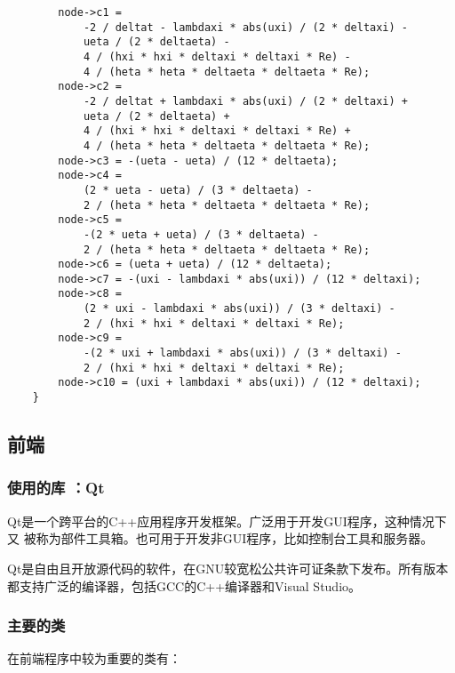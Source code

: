 \documentclass[12pt]{article}
\begin{document}
\begin{itemize}
\begin{lstlisting}
        node->c1 =
            -2 / deltat - lambdaxi * abs(uxi) / (2 * deltaxi) -
            ueta / (2 * deltaeta) -
            4 / (hxi * hxi * deltaxi * deltaxi * Re) -
            4 / (heta * heta * deltaeta * deltaeta * Re);
        node->c2 =
            -2 / deltat + lambdaxi * abs(uxi) / (2 * deltaxi) +
            ueta / (2 * deltaeta) +
            4 / (hxi * hxi * deltaxi * deltaxi * Re) +
            4 / (heta * heta * deltaeta * deltaeta * Re);
        node->c3 = -(ueta - ueta) / (12 * deltaeta);
        node->c4 =
            (2 * ueta - ueta) / (3 * deltaeta) -
            2 / (heta * heta * deltaeta * deltaeta * Re);
        node->c5 =
            -(2 * ueta + ueta) / (3 * deltaeta) -
            2 / (heta * heta * deltaeta * deltaeta * Re);
        node->c6 = (ueta + ueta) / (12 * deltaeta);
        node->c7 = -(uxi - lambdaxi * abs(uxi)) / (12 * deltaxi);
        node->c8 =
            (2 * uxi - lambdaxi * abs(uxi)) / (3 * deltaxi) -
            2 / (hxi * hxi * deltaxi * deltaxi * Re);
        node->c9 =
            -(2 * uxi + lambdaxi * abs(uxi)) / (3 * deltaxi) -
            2 / (hxi * hxi * deltaxi * deltaxi * Re);
        node->c10 = (uxi + lambdaxi * abs(uxi)) / (12 * deltaxi);
    }
\end{lstlisting}
\end{itemize}


\subsection{前端}

\subsubsection{使用的库 ：Qt}
Qt\cite{qt}是一个跨平台的C++应用程序开发框架。广泛用于开发GUI程序，这种情况下又
被称为部件工具箱。也可用于开发非GUI程序，比如控制台工具和服务器。

Qt是自由且开放源代码的软件，在GNU较宽松公共许可证条款下发布。所有版本
都支持广泛的编译器，包括GCC的C++编译器和Visual Studio。

\subsubsection{主要的类}

在前端程序中较为重要的类有：
\end{document}
